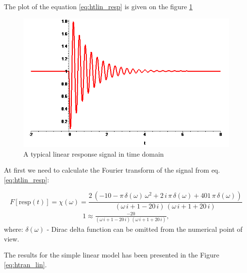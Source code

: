 \documentclass[12pt,twoside,a4paper]{article}
\numberwithin{equation}{subsection}
\numberwithin{figure}{subsection}
\begin{document}
The plot of the equation \ref{eq:htlin_resp} is given on the figure \ref{fig:lin_plot}
\begin{figure}[H]
  \includegraphics[width=150mm]{img/lin_plot.png}
  \caption{A typical linear response signal in time domain \label{fig:lin_plot}}
\end{figure}

At first we need to calculate the Fourier transform of the signal from eq. \ref{eq:htlin_resp}:

\begin{equation} \label{eq:htlin_fresp}
  F[\mathrm{resp}(t)] = \chi (\omega )=\frac {2\,( - 10 - \pi \,\delta (\omega )\,\omega^{2} + 2\,i\,\pi \,\delta (\omega ) +
  401\,\pi \,\delta (\omega))}{(\omega \,i + 1 - 20\,i)\,(\omega \,i + 1 + 20\,i)} 
\end{equation}
\begin{alignat*}{1}
  \approx \frac{ -20}{(\omega \,i + 1 -20\,i)\,(\omega \,i + 1 + 20\,i)},
\end{alignat*}
where: $\delta (\omega )$ - Dirac delta function can be omitted from the numerical point of view.

The results for the simple linear model has been presented in the Figure \ref{eq:htran_lin}.
\end{document}
